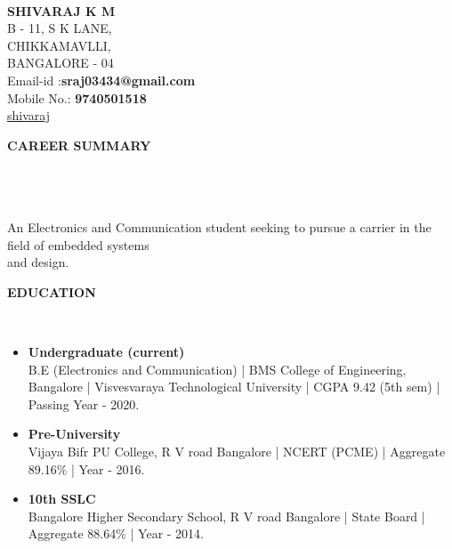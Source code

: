 \documentclass[a4paper,10pt]{article}
\newcommand{\lsep}{-0.5cm}
\newcommand{\resheading}[1]{{\small \colorbox{mygrey}{\begin{minipage}{0.975\textwidth}{\textbf{#1 \vphantom{p\^{E}}}}\end{minipage}}}}
\begin{document}
\hspace{0.5cm}\\[-0.2cm]



\textbf{SHIVARAJ K M} \\ 
\indent B - 11, S K LANE, \\
\indent CHIKKAMAVLLI,\\
\indent BANGALORE - 04\\
\indent Email-id :\textbf{sraj03434@gmail.com} \\
\indent Mobile No.: \textbf{9740501518} \\
\indent\faGithub\href{https://github.com/shiva-raj-km}{shivaraj}\hfill 
{}\\

\resheading{\textbf{CAREER SUMMARY} }\\[\lsep]\\ \\
\indent An Electronics and Communication student seeking to pursue a carrier in the field of embedded systems\\ \indent and design.\\

\resheading{\textbf{EDUCATION} }\\[\lsep]
\begin{itemize}
\item \noindent \textbf{Undergraduate (current)}\\
\indent B.E (Electronics and Communication) | BMS College of Engineering, Bangalore | Visvesvaraya Technological University | CGPA 9.42 (5th sem) | Passing Year - 2020.

\item \noindent \textbf{Pre-University}\\
\indent Vijaya Bifr PU College, R V road Bangalore | NCERT (PCME) | Aggregate 89.16\% | Year - 2016.

\item \noindent \textbf{10th SSLC}\\
\indent Bangalore Higher Secondary School, R V road Bangalore | State Board | Aggregate 88.64\% | Year - 2014.
\end{itemize}
\end{document}
